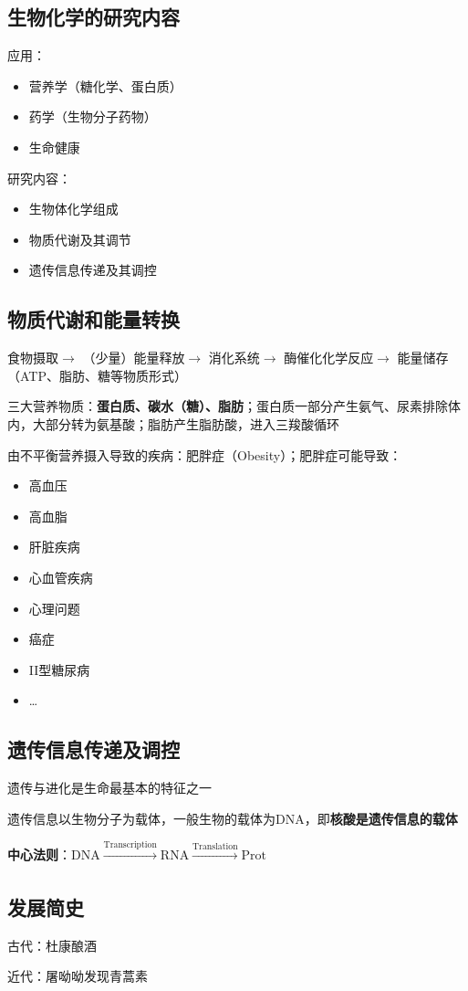 \subsection{生物化学的研究内容}%
\label{sub:生物化学的研究内容}
应用：
\begin{itemize}
    \item 营养学（糖化学、蛋白质）
    \item 药学（生物分子药物）
    \item 生命健康
\end{itemize}
研究内容：
\begin{itemize}
    \item 生物体化学组成
    \item 物质代谢及其调节
    \item 遗传信息传递及其调控
\end{itemize}
\subsection{物质代谢和能量转换}%
\label{sub:物质代谢和能量转换}
食物摄取$\to $ （少量）能量释放$\to $ 消化系统$\to $ 酶催化化学反应$\to $ 能量储存（ATP、脂肪、糖等物质形式）
\begin{notation}
    三大营养物质：\textbf{蛋白质、碳水（糖）、脂肪}；蛋白质一部分产生氨气、尿素排除体内，大部分转为氨基酸；脂肪产生脂肪酸，进入三羧酸循环
\end{notation}
\begin{eg}
    由不平衡营养摄入导致的疾病：肥胖症（Obesity）；肥胖症可能导致：
    \begin{itemize}
        \item 高血压
        \item 高血脂
        \item 肝脏疾病
        \item 心血管疾病
        \item 心理问题
        \item 癌症
        \item II型糖尿病
        \item \ldots 
    \end{itemize}
\end{eg}
\subsection{遗传信息传递及调控}%
\label{sub:遗传信息传递及调控}
\begin{notation}
    遗传与进化是生命最基本的特征之一
\end{notation}
遗传信息以生物分子为载体，一般生物的载体为DNA，即\textbf{核酸是遗传信息的载体}
\begin{notation}
    \textbf{中心法则}：$\text{DNA}\xrightarrow[]{\text{Transcription}}\text{RNA}\xrightarrow[]{\text{Translation}}\text{Prot}$
\end{notation}
\subsection{发展简史}%
\label{sub:发展简史}
古代：杜康酿酒

近代：屠呦呦发现青蒿素
